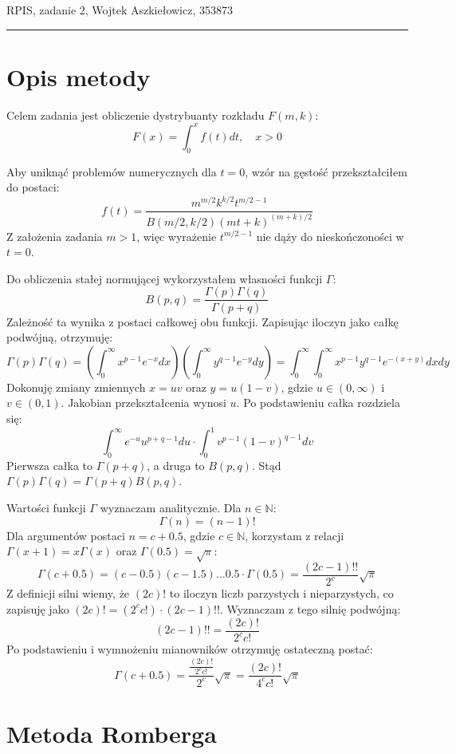 \documentclass[11pt,a4paper]{article}
\begin{document}
{\small \noindent RPIS, zadanie 2, Wojtek Aszkiełowicz, 353873}
\vspace{0.2cm}
\hrule
\vspace{0.8cm}

\section*{Opis metody}

Celem zadania jest obliczenie dystrybuanty rozkładu $F(m,k)$:
$$ F(x) = \int_0^x f(t) dt, \quad x > 0 $$

Aby uniknąć problemów numerycznych dla $t=0$, wzór na gęstość przekształciłem do postaci:
$$ f(t) = \frac{m^{m/2} k^{k/2} t^{m/2-1}}{B(m/2, k/2) (mt+k)^{(m+k)/2}} $$
Z założenia zadania $m > 1$, więc wyrażenie $t^{m/2-1}$ nie dąży do nieskończoności w $t = 0$.

Do obliczenia stałej normującej wykorzystałem własności funkcji $\Gamma$:
$$ B(p,q) = \frac{\Gamma(p)\Gamma(q)}{\Gamma(p+q)} $$
Zależność ta wynika z postaci całkowej obu funkcji. Zapisując iloczyn jako całkę podwójną, otrzymuję:
$$ \Gamma(p)\Gamma(q) = \left( \int_0^\infty x^{p-1} e^{-x} dx \right) \left( \int_0^\infty y^{q-1} e^{-y} dy \right) = \int_0^\infty \int_0^\infty x^{p-1} y^{q-1} e^{-(x+y)} dx dy $$
Dokonuję zmiany zmiennych $x = uv$ oraz $y = u(1-v)$, gdzie $u \in (0, \infty)$ i $v \in (0, 1)$. Jakobian przekształcenia wynosi $u$. Po podstawieniu całka rozdziela się:
$$ \int_0^\infty e^{-u} u^{p+q-1} du \cdot \int_0^1 v^{p-1} (1-v)^{q-1} dv $$
Pierwsza całka to $\Gamma(p+q)$, a druga to $B(p,q)$. Stąd $\Gamma(p)\Gamma(q) = \Gamma(p+q)B(p,q)$.

Wartości funkcji $\Gamma$ wyznaczam analitycznie. Dla $n \in \mathbb{N}$:
$$ \Gamma(n) = (n-1)! $$
Dla argumentów postaci $n = c + 0.5$, gdzie $c \in \mathbb{N}$, korzystam z relacji $\Gamma(x+1) = x \Gamma(x)$ oraz $\Gamma(0.5) = \sqrt{\pi}$:
$$ \Gamma(c + 0.5) = (c - 0.5)(c - 1.5) \dots 0.5 \cdot \Gamma(0.5) = \frac{(2c-1)!!}{2^c} \sqrt{\pi} $$
Z definicji silni wiemy, że $(2c)!$ to iloczyn liczb parzystych i nieparzystych, co zapisuję jako $(2c)! = (2^c c!) \cdot (2c-1)!!$. Wyznaczam z tego silnię podwójną:
$$ (2c-1)!! = \frac{(2c)!}{2^c c!} $$
Po podstawieniu i wymnożeniu mianowników otrzymuję ostateczną postać:
$$ \Gamma(c+0.5) = \frac{\frac{(2c)!}{2^c c!}}{2^c} \sqrt{\pi} = \frac{(2c)!}{4^c c!} \sqrt{\pi} $$

\section*{Metoda Romberga}
\end{document}
